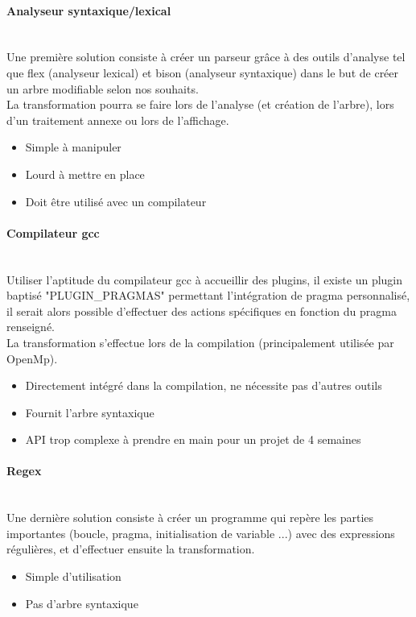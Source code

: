 \documentclass{article}
\begin{document}
	\paragraph{Analyseur syntaxique/lexical}
	~~\\
	\indent
	Une première solution consiste à créer un parseur grâce à des outils d'analyse tel que flex (analyseur lexical) et bison (analyseur syntaxique) dans le but de créer un arbre modifiable selon nos souhaits.\\
	La transformation pourra se faire lors de l'analyse (et création de l'arbre), lors d'un traitement annexe ou lors de l'affichage.\\
	\begin{itemize}
		\item Simple à manipuler
		\item Lourd à mettre en place
		\item Doit être utilisé avec un compilateur
	\end{itemize}
	
	\paragraph{Compilateur gcc}
		~~\\
	\indent
	Utiliser l'aptitude du compilateur gcc à accueillir des plugins, il existe un plugin baptisé "PLUGIN\_PRAGMAS" permettant l'intégration de pragma personnalisé, il serait alors possible d'effectuer des actions spécifiques en fonction du pragma renseigné.\\ La transformation s'effectue lors de la compilation (principalement utilisée par OpenMp). \\
	\begin{itemize}
		\item Directement intégré dans la compilation, ne nécessite pas d'autres outils
		\item Fournit l'arbre syntaxique
		\item API trop complexe à prendre en main pour un projet de 4 semaines
	\end{itemize}
	
	
	\paragraph{Regex}
	~~\\
	\indent
	Une dernière solution consiste à créer un programme qui repère les parties importantes (boucle, pragma, initialisation de variable ...) avec des expressions régulières, et d'effectuer ensuite la transformation.
	\begin{itemize}
		\item Simple d'utilisation
		\item Pas d'arbre syntaxique
	\end{itemize}
		
\end{document}
